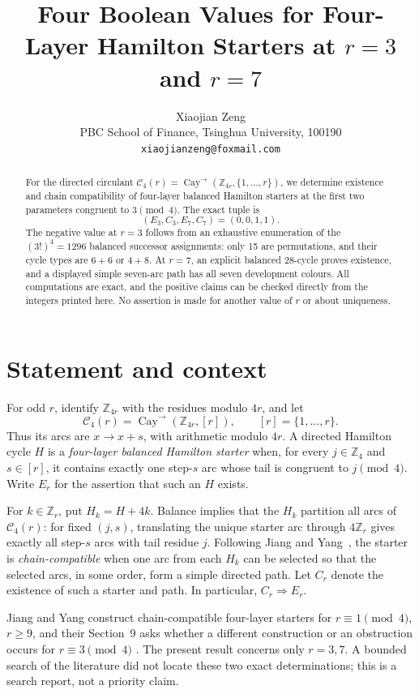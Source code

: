 \documentclass[11pt]{article}
\title{Four Boolean Values for Four-Layer Hamilton Starters at
  \(r=3\) and \(r=7\)}
\author{Xiaojian Zeng\\
PBC School of Finance, Tsinghua University, 100190\\
\texttt{xiaojianzeng@foxmail.com}}
\date{}
\newcommand{\Z}{\mathbb Z}
\newcommand{\Cr}{\mathcal C_4(r)}
\begin{document}
\maketitle

\begin{abstract}
For the directed circulant
\(\mathcal C_4(r)=\operatorname{Cay}^{\to}(\Z_{4r},\{1,\ldots,r\})\),
we determine existence and chain compatibility of four-layer balanced
Hamilton starters at the first two parameters congruent to \(3\pmod 4\).
The exact tuple is
\[
  (E_3,C_3,E_7,C_7)=(0,0,1,1).
\]
The negative value at \(r=3\) follows from an exhaustive enumeration of the
\((3!)^4=1296\) balanced successor assignments: only 15 are permutations,
and their cycle types are \(6+6\) or \(4+8\).  At \(r=7\), an explicit
balanced 28-cycle proves existence, and a displayed simple seven-arc path
has all seven development colours.  All computations are exact, and the
positive claims can be checked directly from the integers printed here.
No assertion is made for another value of \(r\) or about uniqueness.
\end{abstract}

\section{Statement and context}

For odd \(r\), identify \(\Z_{4r}\) with the residues modulo \(4r\), and let
\[
  \Cr=\operatorname{Cay}^{\to}(\Z_{4r},[r]),
  \qquad [r]=\{1,\ldots,r\}.
\]
Thus its arcs are \(x\to x+s\), with arithmetic modulo \(4r\).  A directed
Hamilton cycle \(H\) is a \emph{four-layer balanced Hamilton starter} when,
for every \(j\in\Z_4\) and \(s\in[r]\), it contains exactly one step-\(s\)
arc whose tail is congruent to \(j\pmod 4\).  Write \(E_r\) for the assertion
that such an \(H\) exists.

For \(k\in\Z_r\), put \(H_k=H+4k\).  Balance implies that the \(H_k\)
partition all arcs of \(\Cr\): for fixed \((j,s)\), translating the unique
starter arc through \(4\Z_r\) gives exactly all step-\(s\) arcs with tail
residue \(j\).  Following Jiang and Yang~\cite{JiangYang2026}, the starter is
\emph{chain-compatible} when one arc from each \(H_k\) can be selected so
that the selected arcs, in some order, form a simple directed path.  Let
\(C_r\) denote the existence of such a starter and path.  In particular,
\(C_r\Rightarrow E_r\).

Jiang and Yang construct chain-compatible four-layer starters for
\(r\equiv1\pmod4\), \(r\geq9\), and their Section~9 asks whether a different
construction or an obstruction occurs for \(r\equiv3\pmod4\)
\cite{JiangYang2026}.  The present result concerns only \(r=3,7\).  A bounded
search of the literature did not locate these two exact determinations; this
is a search report, not a priority claim.
\end{document}
